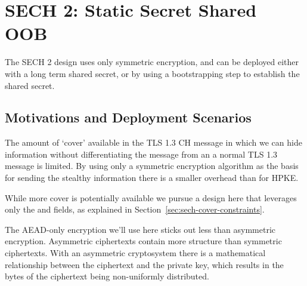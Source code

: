\section{SECH 2: Static Secret Shared OOB}
The \ac{SECH} 2 design uses only symmetric encryption, and can be deployed either with a long term shared secret, or by using a bootstrapping step to establish the shared secret.

\subsection{Motivations and Deployment Scenarios}

The amount of `cover' available in the TLS 1.3 \ac{CH} message in which we can hide information without differentiating the message from an a normal TLS 1.3 message is limited.
By using only a symmetric encryption algorithm as the basis for sending the stealthy information there is a smaller overhead than for \ac{HPKE}.

While more cover is potentially available we
pursue a design here that leverages only the
 and  fields,
as explained in Section~\ref{sec:sech-cover-constraints}.



The \ac{AEAD}-only encryption we'll use here
sticks out less than asymmetric encryption.
Asymmetric ciphertexts contain more structure
than symmetric ciphertexts.
With an asymmetric cryptosystem there is
a mathematical relationship between the ciphertext and the private key,
which results in the bytes of the ciphertext being non-uniformly distributed.


